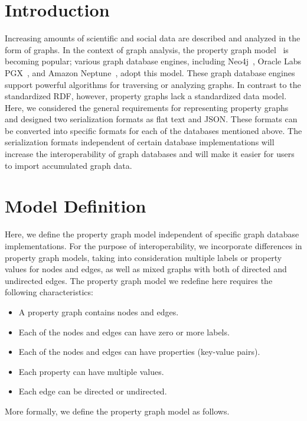 \documentclass[runningheads]{llncs}
\begin{document}
\section{Introduction}
Increasing amounts of scientific and social data are described and analyzed in the form of graphs. In the context of graph analysis, the property graph model~\cite{angles} is becoming popular; various graph database engines, including Neo4j~\cite{neo4j}, Oracle Labs PGX~\cite{pgx}, and Amazon Neptune~\cite{neptune}, adopt this model. These graph database engines support powerful algorithms for traversing or analyzing graphs. 
In contrast to the standardized RDF, however, property graphs lack a standardized data model.
Here, we considered the general requirements for representing property graphs and designed two serialization formats as flat text and JSON. These formats can be converted into specific formats for each of the databases mentioned above. The serialization formats independent of certain database implementations will increase the interoperability of graph databases and will make it easier for users to import accumulated graph data.

\section{Model Definition}
Here, we define the property graph model independent of specific graph database implementations. For the purpose of interoperability, we incorporate differences in property graph models, taking into consideration multiple labels or property values for nodes and edges, as well as mixed graphs with both of directed and undirected edges. The property graph model we redefine here requires the following characteristics:

\begin{itemize}
    \item A property graph contains nodes and edges.
    \item Each of the nodes and edges can have zero or more labels.
    \item Each of the nodes and edges can have properties (key-value pairs).
    \item Each property can have multiple values.
    \item Each edge can be directed or undirected.
\end{itemize}
More formally, we define the property graph model as follows.
\end{document}
